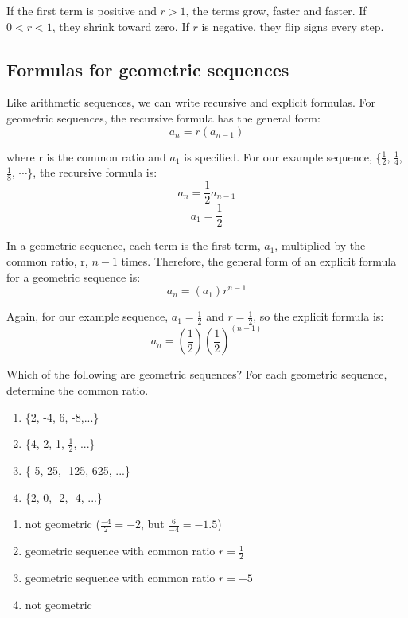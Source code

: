If the first term is positive and $r > 1$, the terms grow, faster and
faster. If $0 < r < 1$, they shrink toward zero. If $r$ is negative, they
flip signs every step. 

\subsection{Formulas for geometric sequences}
Like arithmetic sequences, we can write recursive and explicit 
formulas. For geometric sequences, the recursive formula has the 
general form: 
$$a_n = r(a_{n-1})$$

where r is the common ratio and $a_1$ is specified. For our example 
sequence, \{$\frac{1}{2}$, $\frac{1}{4}$, $\frac{1}{8}$, $\cdots$\}, 
the recursive formula is:
$$a_n = \frac{1}{2}a_{n-1}$$
$$a_1 = \frac{1}{2}$$

In a geometric sequence, each term is the first term, $a_1$, 
multiplied by the common ratio, r, $n-1$ times. Therefore, the 
general form of an explicit formula for a geometric sequence is:
$$a_n = (a_1)r^{n-1}$$

Again, for our example sequence, $a_1 = \frac{1}{2}$ and $r = 
\frac{1}{2}$, so the explicit formula is:
$$a_n = (\frac{1}{2})(\frac{1}{2})^{(n-1)}$$

\begin{Exercise}[label=seq4]
Which of the following are geometric sequences? For each geometric 
sequence, determine the common ratio.
\begin{enumerate}
\item \{2, -4, 6, -8,...\}
\item \{4, 2, 1, $\frac{1}{2}$, ...\}
\item \{-5, 25, -125, 625, ...\}
\item \{2, 0, -2, -4, ...\}
\end{enumerate}
\end{Exercise}

\begin{Answer}[ref=seq4]
\begin{enumerate}
\item not geometric ($\frac{-4}{2} = -2$, but $\frac{6}{-4} = -1.5$)
\item geometric sequence with common ratio $r = \frac{1}{2}$
\item geometric sequence with common ratio $r = -5$
\item not geometric
\end{enumerate}
\end{Answer}

